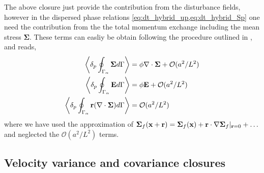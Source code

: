 The above closure just provide the contribution from the disturbance fields, however in the dispersed phase relations \eqref{eq:dt_hybrid_up,eq:dt_hybrid_Sp} one need the contribution from the the total momentum exchange including the mean stress $\bm\Sigma$. 
These terms can easliy be obtain following the procedure outlined in \citep{zhang1997momentum,morel2015mathematical}, and reads, 
\begin{align}
    \pSavg{\bm\Sigma}
    &= \phi\div\bm\Sigma + \mathcal{O}(a^2/L^2)\\
    \pSavg{\textbf{E}}
    &= \phi \textbf{E}+ \mathcal{O}(a^2/L^2)\\
    \pSavg{\textbf{r}(\div \bm\Sigma)}
    &= \mathcal{O}(a^2/L^2)
    \label{eq:mean_contributions}
\end{align}
where we have used the approximation of $\bm\Sigma_f(\textbf{x}+\textbf{r}) = \bm\Sigma_f(\textbf{x}) + \textbf{r}\cdot\mathbf{\nabla} \bm\Sigma_f|_{\textbf{r}=0} + \ldots$ and neglected the $\mathcal{O}(a^2/L^2)$ terms. 


\subsection{Velocity variance and covariance closures}


